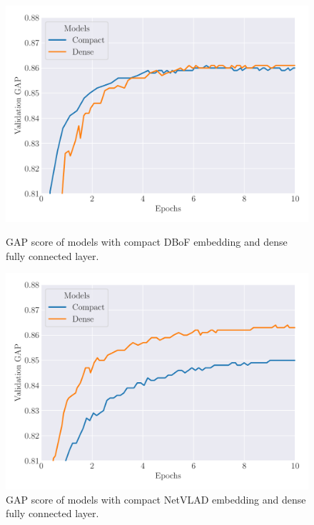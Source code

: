 \begin{figure}[p!]
  \center
  \includegraphics[width=\scalefigure\textwidth]{figures/appendix/ap2-training_video_classification/graph_fc_circulant_embedding_dbof}
  \caption{GAP score of models with compact DBoF embedding and dense fully connected layer.}
  \label{figure:ap2-validation_gap_compact_dbof}
  \vspace{2cm}
  \includegraphics[width=\scalefigure\textwidth]{figures/appendix/ap2-training_video_classification/graph_fc_circulant_embedding_netvlad}
  \caption{GAP score of models with compact NetVLAD embedding and dense fully connected layer.}
  \label{figure:ap2-validation_gap_compact_netvlad}
\end{figure}

